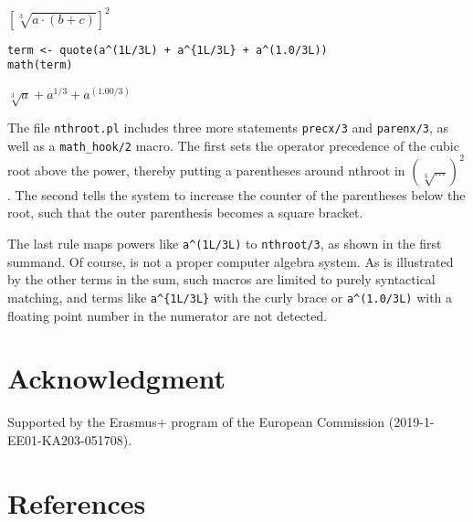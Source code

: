 \({\left[\sqrt[3]{{a}{\cdot}{\left({b}{+}{c}\right)}}\right]}^{2}\)

\begin{verbatim}
term <- quote(a^(1L/3L) + a^{1L/3L} + a^(1.0/3L))
math(term)
\end{verbatim}

\({{\sqrt[3]{a}}{+}{{a}^{{1}{/}{3}}}}{+}{{a}^{\left({1.00}{/}{3}\right)}}\)

The file \texttt{nthroot.pl} includes three more statements \texttt{precx/3} and \texttt{parenx/3},
as well as a \texttt{math\_hook/2} macro. The first sets the operator precedence of the
cubic root above the power, thereby putting a parentheses around nthroot
in \((\sqrt[3]{\ldots})^2\). The second tells the system to increase the counter
of the parentheses below the root, such that the outer parenthesis becomes a
square bracket.

The last rule maps powers like \texttt{a\^{}(1L/3L)} to \texttt{nthroot/3}, as shown in the
first summand. Of course,  is not a proper computer algebra system.
As is illustrated by the other terms in the sum, such macros are limited to
purely syntactical matching, and terms like \texttt{a\^{}\{1L/3L\}} with the curly brace
or \texttt{a\^{}(1.0/3L)} with a floating point number in the numerator are not detected.

\hypertarget{acknowledgment}{%
\section{Acknowledgment}\label{acknowledgment}}

Supported by the Erasmus+ program of the European
Commission (2019-1-EE01-KA203-051708).

\hypertarget{references}{%
\section*{References}\label{references}}

